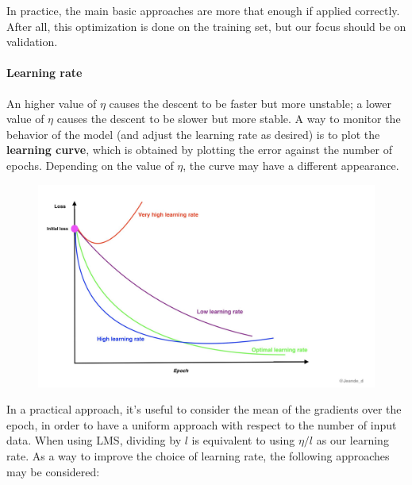 In practice, the main basic approaches are more that enough if applied correctly. After all, this optimization is done on the training set, but our focus should be on validation.

\paragraph{Learning rate}

An higher value of $\eta$ causes the descent to be faster but more unstable; a lower value of $\eta$ causes the descent to be slower but more stable. A way to monitor the behavior of the model (and adjust the learning rate as desired) is to plot the \textbf{learning curve}, which is obtained by plotting the error against the number of epochs. Depending on the value of $\eta$, the curve may have a different appearance.

\begin{figure}[ht]
    \centering
    \includegraphics[width=0.5\linewidth]{img/Learning curve and eta.png}
\end{figure}
In a practical approach, it's useful to consider the mean of the gradients over the epoch, in order to have a uniform approach with respect to the number of input data. When using LMS, dividing by $l$ is equivalent to using $\eta/l$ as our learning rate. As a way to improve the choice of learning rate, the following approaches may be considered:

